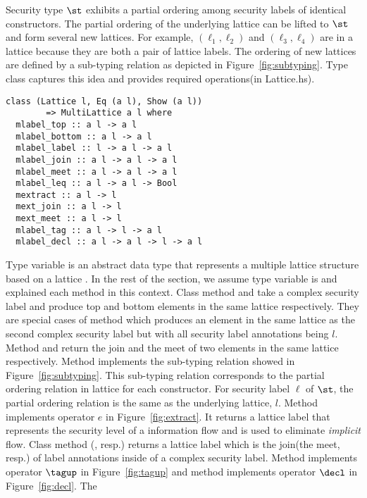 Security type $\st$ exhibits a partial ordering among security labels of identical
constructors. The partial ordering of the underlying lattice can
be lifted to $\st$ and form several new lattices. For example, $(\ell_1,\ell_2)$ and $(\ell_3,\ell_4)$
are in a lattice because they are both a pair of lattice labels.
The ordering of new lattices are defined by a sub-typing relation as depicted in
Figure~\ref{fig:subtyping}.
Type class  captures this idea and provides
required operations(in Lattice.hs).
\begin{verbatim}
class (Lattice l, Eq (a l), Show (a l)) 
        => MultiLattice a l where
  mlabel_top :: a l -> a l
  mlabel_bottom :: a l -> a l
  mlabel_label :: l -> a l -> a l
  mlabel_join :: a l -> a l -> a l
  mlabel_meet :: a l -> a l -> a l
  mlabel_leq :: a l -> a l -> Bool
  mextract :: a l -> l
  mext_join :: a l -> l
  mext_meet :: a l -> l
  mlabel_tag :: a l -> l -> a l
  mlabel_decl :: a l -> a l -> l -> a l
\end{verbatim} 
Type variable  is an abstract data type that represents a multiple lattice
structure based on a lattice . In the rest of the section, we assume type
variable  is  and explained each method in this context.
Class method  and  take a complex security label
and produce top and bottom elements in the same lattice respectively.
They are special cases of method  which produces an element in the
same lattice as the second complex security label but with all security label annotations being $l$.
Method  and  return the join and the meet of two
elements in the same lattice respectively.
Method  implements the sub-typing relation showed in 
Figure~\ref{fig:subtyping}. This sub-typing relation corresponds to the partial
ordering relation in lattice for each constructor. For security label $\ell$ of $\st$,
the partial ordering relation is the same as the underlying lattice, $l$.
Method  implements operator $e$ in Figure~\ref{fig:extract}. It returns 
a lattice label that represents the security level of a information flow and is used
to eliminate {\em implicit} flow.
Class method (, resp.) returns a lattice label which is
the join(the meet, resp.) of label annotations inside of a complex security label. 
Method  implements operator $\tagup$ in Figure~\ref{fig:tagup} and
method  implements operator $\decl$ in Figure~\ref{fig:decl}. The 
